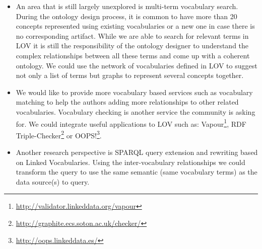\documentclass{iosart2c}
\begin{document}
\begin{itemize}
\item An area that is still largely unexplored is multi-term vocabulary search. During the ontology design process, it is common to have more than 20 concepts represented using existing vocabularies or a new one in case there is no corresponding artifact. While we are able to search for relevant terms in LOV it is still the responsibility of the ontology designer to understand the complex relationships between all these terms and come up with a coherent ontology. We could use the network of vocabularies defined in LOV to suggest not only a list of terms but graphs to represent several concepts together.

\item We would like to provide more vocabulary based services such as vocabulary matching to help the authors adding more relationships to other related vocabularies. Vocabulary checking is another service the community is asking for. We could integrate useful applications to LOV such as: Vapour\footnote{\url{http://validator.linkeddata.org/vapour}}, RDF Triple-Checker\footnote{\url{http://graphite.ecs.soton.ac.uk/checker/}} or OOPS!\footnote{\url{http://oops.linkeddata.es/}}.

\item Another research perspective is SPARQL query extension and rewriting based on Linked Vocabularies. Using the inter-vocabulary relationships we could transform the query to use the same semantic (same vocabulary terms) as the data source(s) to query.
\end{itemize}




\end{document}
